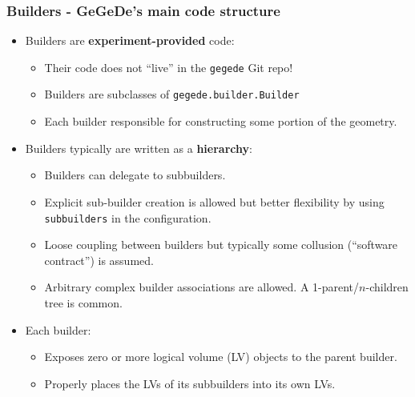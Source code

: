\documentclass[10pt,xcolor=dvipsnames]{beamer}
\begin{document}
\begin{frame}[fragile]
  \frametitle{Builders - GeGeDe's main code structure}
  \begin{itemize}
  \item Builders are \textbf{experiment-provided} code:
    \begin{itemize}\footnotesize
    \item Their code does not ``live'' in the \texttt{gegede} Git repo!
    \item Builders are subclasses of
      \texttt{gegede.builder.Builder} 
    \item Each builder responsible for constructing some portion of the geometry.
    \end{itemize}
    
  \item Builders typically are written as a \textbf{hierarchy}:
    \begin{itemize}\footnotesize
    \item Builders can delegate to subbuilders.
    \item Explicit sub-builder creation is allowed but
      better flexibility by using \texttt{subbuilders} in the configuration.
    \item Loose coupling between builders but typically some collusion 
      (``software contract'') is assumed.
    \item Arbitrary complex builder associations are allowed.  A
        1-parent/$n$-children tree is common.
    \end{itemize}


  \item Each builder:
    \begin{itemize}\footnotesize
    \item Exposes zero or more logical volume (LV) objects to the parent builder.
    \item Properly places the LVs of its subbuilders into its own LVs.
    \end{itemize}


  \end{itemize}

\end{frame}
\end{document}
